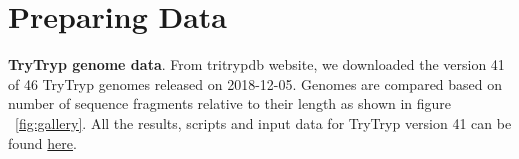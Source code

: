 \documentclass[
10pt, %
a4paper, %
oneside, %
headinclude,footinclude, %
BCOR5mm, %
]{scrartcl}
\title{\normalfont\spacedallcaps{Article Title}} %
\author{\spacedlowsmallcaps{Fatemeh Hadi Nezhad\textsuperscript{1}}}
\date{2019} %
\begin{document}

\renewcommand{\sectionmark}[1]{\markright{\spacedlowsmallcaps{#1}}} %
\lehead{\mbox{\llap{\small\thepage\kern1em\color{halfgray} \vline}\color{halfgray}\hspace{0.5em}\rightmark\hfil}} %

\pagestyle{scrheadings} %


\maketitle %

\setcounter{tocdepth}{2} %

\tableofcontents %


\let\thefootnote\relax{}


\newpage 


\section{Preparing Data}
\textbf{TryTryp genome data}. From tritrypdb website, we downloaded the version 41 of 46 TryTryp genomes released on 2018-12-05. Genomes are compared based on number of sequence fragments relative to their length as shown in figure ~\vref{fig:gallery}. 
All the results, scripts and input data for TryTryp version 41 can be found \href{thesentence}{here}. 
\end{document}
